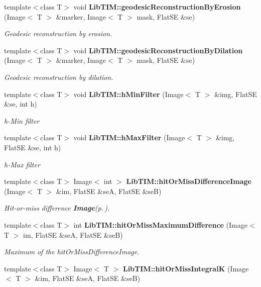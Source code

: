 \begin{CompactItemize}
template$<$class T$>$ void {\bf Lib\-TIM::geodesic\-Reconstruction\-By\-Erosion} (Image$<$ T $>$ \&marker, Image$<$ T $>$ mask, Flat\-SE \&se)
\begin{CompactList}\small\item\em Geodesic reconstruction by erosion. \item\end{CompactList}\item 
template$<$class T$>$ void {\bf Lib\-TIM::geodesic\-Reconstruction\-By\-Dilation} (Image$<$ T $>$ \&marker, Image$<$ T $>$ mask, Flat\-SE \&se)
\begin{CompactList}\small\item\em Geodesic reconstruction by dilation. \item\end{CompactList}\item 
template$<$class T$>$ void {\bf Lib\-TIM::h\-Min\-Filter} (Image$<$ T $>$ \&img, Flat\-SE \&se, int h)
\begin{CompactList}\small\item\em h-Min filter \item\end{CompactList}\item 
template$<$class T$>$ void {\bf Lib\-TIM::h\-Max\-Filter} (Image$<$ T $>$ \&img, Flat\-SE \&se, int h)
\begin{CompactList}\small\item\em h-Max filter \item\end{CompactList}\item 
template$<$class T$>$ Image$<$ int $>$ {\bf Lib\-TIM::hit\-Or\-Miss\-Difference\-Image} (Image$<$ T $>$ \&im, Flat\-SE \&se\-A, Flat\-SE \&se\-B)
\begin{CompactList}\small\item\em Hit-or-miss difference {\bf Image}{\rm (p.\,\pageref{classLibTIM_1_1Image})}. \item\end{CompactList}\item 
template$<$class T$>$ int {\bf Lib\-TIM::hit\-Or\-Miss\-Maximum\-Difference} (Image$<$ T $>$ im, Flat\-SE \&se\-A, Flat\-SE \&se\-B)
\begin{CompactList}\small\item\em Maximum of the hit\-Or\-Miss\-Difference\-Image. \item\end{CompactList}\item 
template$<$class T$>$ Image$<$ T $>$ {\bf Lib\-TIM::hit\-Or\-Miss\-Integral\-K} (Image$<$ T $>$ \&im, Flat\-SE \&se\-A, Flat\-SE \&se\-B)

\end{CompactItemize}
